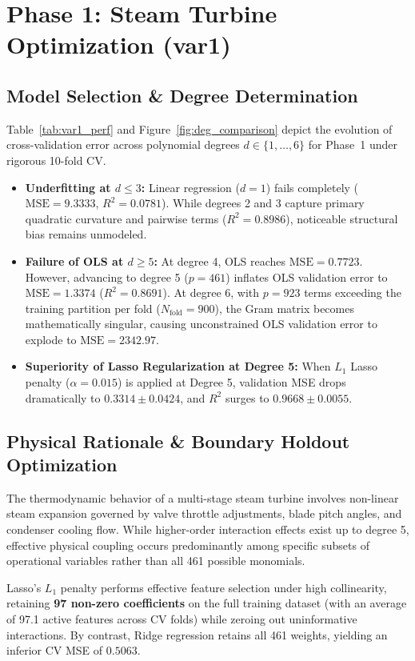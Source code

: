 \documentclass[10pt,twocolumn]{article}
\begin{document}
\section{Phase 1: Steam Turbine Optimization (var1)}

\subsection{Model Selection \& Degree Determination}
Table~\ref{tab:var1_perf} and Figure~\ref{fig:deg_comparison} depict the evolution of cross-validation error across polynomial degrees $d \in \{1, \dots, 6\}$ for Phase~1 under rigorous 10-fold CV.
\begin{itemize}\setlength{\itemsep}{1pt}
    \item \textbf{Underfitting at $d \le 3$:} Linear regression ($d=1$) fails completely ($\text{MSE}=9.3333$, $R^2=0.0781$). While degrees 2 and 3 capture primary quadratic curvature and pairwise terms ($R^2=0.8986$), noticeable structural bias remains unmodeled.
    \item \textbf{Failure of OLS at $d \ge 5$:} At degree 4, OLS reaches $\text{MSE}=0.7723$. However, advancing to degree 5 ($p=461$) inflates OLS validation error to $\text{MSE}=1.3374$ ($R^2=0.8691$). At degree 6, with $p=923$ terms exceeding the training partition per fold ($N_{\text{fold}}=900$), the Gram matrix becomes mathematically singular, causing unconstrained OLS validation error to explode to $\text{MSE}=2342.97$.
    \item \textbf{Superiority of Lasso Regularization at Degree 5:} When $L_1$ Lasso penalty ($\alpha = 0.015$) is applied at Degree 5, validation MSE drops dramatically to $\mathbf{0.3314 \pm 0.0424}$, and $R^2$ surges to $\mathbf{0.9668 \pm 0.0055}$.
\end{itemize}

\subsection{Physical Rationale \& Boundary Holdout Optimization}
The thermodynamic behavior of a multi-stage steam turbine involves non-linear steam expansion governed by valve throttle adjustments, blade pitch angles, and condenser cooling flow. While higher-order interaction effects exist up to degree 5, effective physical coupling occurs predominantly among specific subsets of operational variables rather than all 461 possible monomials.

Lasso's $L_1$ penalty performs effective feature selection under high collinearity, retaining \textbf{97 non-zero coefficients} on the full training dataset (with an average of 97.1 active features across CV folds) while zeroing out uninformative interactions. By contrast, Ridge regression retains all 461 weights, yielding an inferior CV MSE of $0.5063$. 
\end{document}
